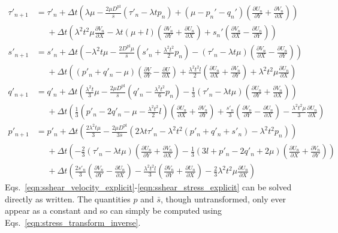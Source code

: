 \documentclass[11pt]{article}
\newcommand{\p}{\partial}
\newcommand{\Dpl}{D^\text{pl}}
\begin{document}
\begin{align}
    \tau'_{n+1} &= \tau'_n + \Delta t \left(\lambda \mu - \frac{2\mu\Dpl}{\bar{s}}(\tau'_n - \lambda t p_n) + (\mu - p_n' - q_n')\left(\frac{\p U_n}{\p Y} + \frac{\p V_n}{\p X}\right)\right) \nonumber \\
    &\phantom{=} + \Delta t\left(\lambda^2 t^2 \mu \frac{\p V_n}{\p X} - \lambda t (\mu + l)\left(\frac{\p V_n}{\p Y} + \frac{\p U_n}{\p X}\right) + s_n'\left(\frac{\p V_n}{\p X} - \frac{\p U_n}{\p Y}\right)\right)\\
%
    s'_{n+1} &=  s'_n + \Delta t \left(-\lambda^2 t \mu - \frac{2\Dpl\mu}{\bar{s}}\left(s'_n + \frac{\lambda^2 t^2}{2}p_n\right) - \left(\tau'_n - \lambda t \mu\right)\left(\frac{\p V_n}{\p X} - \frac{\p U_n}{\p Y}\right)\right)\nonumber\\
    &\phantom{=} + \Delta t\left(\left(p'_n + q'_n - \mu\right)\left(\frac{\p V}{\p Y} - \frac{\p U}{\p X}\right) + \frac{\lambda^2 t^2 l}{2}\left(\frac{\p U_n}{\p X} + \frac{\p V_n}{\p Y}\right) + \lambda^2 t^2\mu\frac{\p U_n}{\p X}\right)\\
%
    q'_{n+1} &= q'_n + \Delta t \left(\frac{\lambda^2 t}{3}\mu - \frac{2\mu\Dpl}{\bar{s}}\left(q'_n - \frac{\lambda^2 t^2}{6}p_n\right) - \frac{1}{3}(\tau'_n - \lambda t \mu)\left(\frac{\p U_n}{\p Y} + \frac{\p V_n}{\p X}\right)  \right)\nonumber\\
    &\phantom{=} + \Delta t \left(\frac{1}{3}\left(p'_n - 2q'_n - \mu - \frac{\lambda^2 t^2}{2}l\right)\left(\frac{\p U_n}{\p X} + \frac{\p V_n}{\p Y}\right) + \frac{s'_n}{3}\left(\frac{\p V_n}{\p Y} - \frac{\p U_n}{\p X}\right) - \frac{ \lambda^2 t^2 \mu }{3} \frac{\p U_n}{\p X}\right)\\
%
    p'_{n+1} &= p'_n + \Delta t \left(\frac{2\lambda^2 t \mu}{3} - \frac{2\mu\Dpl}{3\bar{s}}(2\lambda t \tau'_n - \lambda^2 t^2 (p'_n + q'_n + s'_n) - \lambda^2 t^2 p_n)\right)\nonumber\\
    &\phantom{=} + \Delta t\left(-\frac{2}{3}(\tau'_n - \lambda t \mu)\left(\frac{\p U_n}{\p Y} + \frac{\p V_n}{\p X}\right) - \frac{1}{3}(3l + p'_n - 2q'_n + 2\mu)\left(\frac{\p U_n}{\p X} + \frac{\p V_n}{\p Y}\right)\right)\nonumber\\
    &\phantom{=} + \Delta t\left(\frac{2s'_n}{3}\left(\frac{\p V_n}{\p Y} - \frac{\p U_n}{\p X}\right) - \frac{\lambda^2 t^2 l}{3}\left(\frac{\p V_n}{\p Y} + \frac{\p U_n}{\p X}\right) - \frac{2}{3}\lambda^2 t^2 \mu \frac{\p U_n}{\p X}\right)
    \label{eqn:sshear_stress_explicit}
\end{align}
Eqs.~\ref{eqn:sshear_velocity_explicit}-\ref{eqn:sshear_stress_explicit} can be solved directly as written. The quantities $p$ and $\bar{s}$, though untransformed, only ever appear as a constant and so can simply be computed using Eqs.~\ref{eqn:stress_transform_inverse}.
\end{document}
